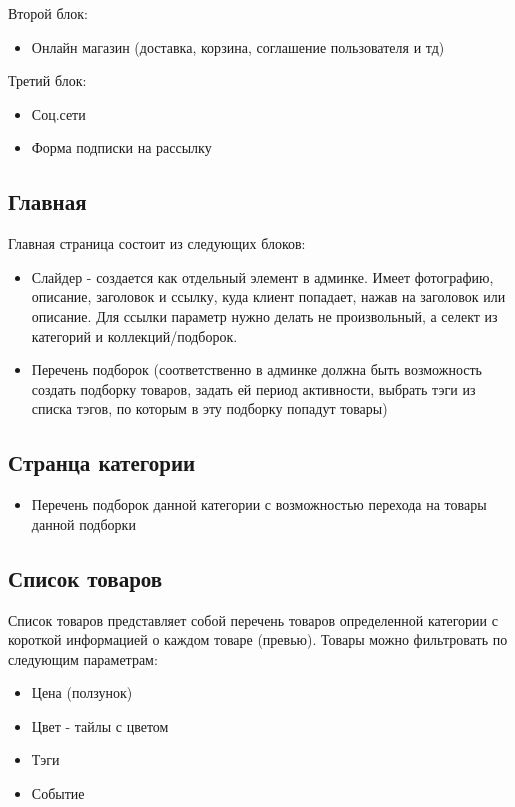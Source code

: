\documentclass[DIV=calc, paper=a4, fontsize=11pt]{scrartcl} %
\begin{document}
Второй блок:
\begin{itemize}
	\item Онлайн магазин (доставка, корзина, соглашение пользователя и тд)
\end{itemize}

Третий блок:
\begin{itemize}
	\item Соц.сети
	\item Форма подписки на рассылку
\end{itemize}


\subsection{Главная}
Главная страница состоит из следующих блоков:
\begin{itemize}
	\item Слайдер - создается как отдельный элемент в админке. Имеет фотографию, описание, заголовок и ссылку, куда клиент попадает, нажав на заголовок или описание. Для ссылки параметр нужно делать не произвольный, а селект из категорий и коллекций/подборок.
	\item Перечень подборок (соответственно в админке должна быть возможность создать подборку товаров, задать ей период активности, выбрать тэги из списка тэгов, по которым в эту подборку попадут товары)
\end{itemize}

\subsection{Странца категории}
\begin{itemize}
	\item Перечень подборок данной категории с возможностью перехода на товары данной подборки
\end{itemize}


\subsection{Список товаров}
Список товаров представляет собой перечень товаров определенной категории с короткой информацией о каждом товаре (превью). Товары можно фильтровать по следующим параметрам:

\begin{itemize}
	\item Цена (ползунок)
	\item Цвет - тайлы с цветом
	\item Тэги
	\item Событие
\end{itemize}
\end{document}
